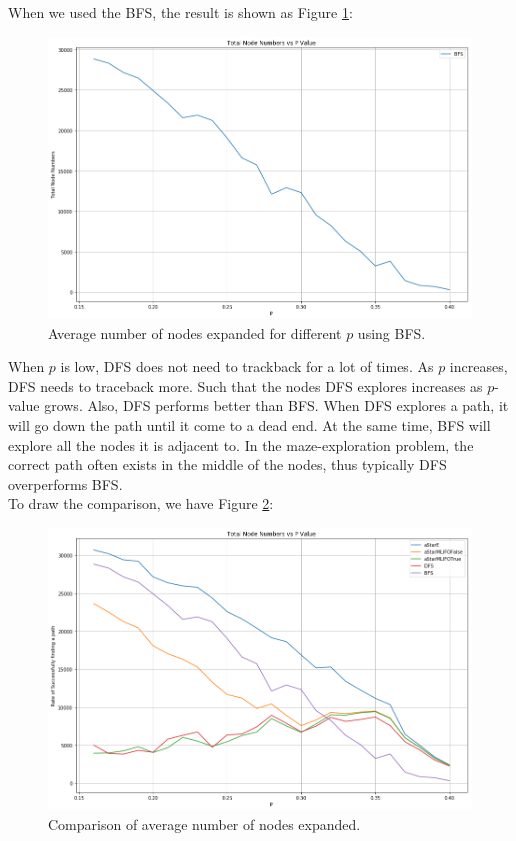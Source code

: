 \documentclass[letter]{article}
\begin{document}
\begin{questions}
	When we used the BFS, the result is shown as Figure \ref{fig:7-2}: \\
	
	\begin{figure}
		\centering
		\includegraphics[width=\textwidth]{../pics/question7-2.png}
		\caption{\label{fig:7-2} Average number of nodes expanded for different $ p $ using BFS.}
	\end{figure}

	When $ p $ is low, DFS does not need to trackback for a lot of times. As $ p $ increases, DFS needs to traceback more. Such that the nodes DFS explores increases as $ p $-value grows. Also, DFS performs better than BFS. When DFS explores a path, it will go down the path until it come to a dead end. At the same time, BFS will explore all the nodes it is adjacent to. In the maze-exploration problem, the correct path often exists in the middle of the nodes, thus typically DFS overperforms BFS. \\
	
	To draw the comparison, we have Figure \ref{fig:7-3}: \\
	
	\begin{figure}
		\centering
		\includegraphics[width=\textwidth]{../pics/question7-3.png}
		\caption{\label{fig:7-3} Comparison of average number of nodes expanded.}
	\end{figure}
	
	
\end{questions}
\end{document}
